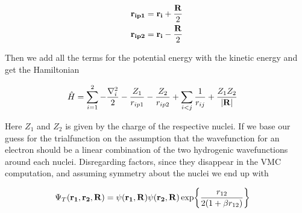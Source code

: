 		\begin{align}
			\vb{r_{ip1}} = \vb{r_i} + \frac{\vb{R}}{2}
			\\
			\vb{r_{ip2}} = \vb{r_i} - \frac{\vb{R}}{2}
		\end{align}

		Then we add all the terms for the potential energy with the kinetic energy and get the Hamiltonian

		\begin{align}
			\hat{H} &= \sum_{i = 1}^2 - \frac{\nabla^2_i}{2} - \frac{Z_1}{r_{ip1}} - \frac{Z_2}{r_{ip2}} + \sum_{i < j}\frac{1}{r_{ij}} + \frac{Z_1Z_2}{|\vb{R|}} \label{eq:hamiltonianMolecule}
		\end{align}

		Here \(Z_1\) and \(Z_2\) is given by the charge of the respective nuclei. If we base our guess for the trialfunction on the assumption that the wavefunction for an electron should be a linear combination of the two hydrogenic wavefunctions around each nuclei. Disregarding factors, since they disappear in the VMC computation, and assuming symmetry about the nuclei we end up with

		\begin{align}
			\Psi_T(\vb{r_1}, \vb{r_2} , \vb{R} ) &= \psi(\vb{r_1} , \vb{R})\psi(\vb{r_2} , \vb{R}) \exp{ \frac{r_{12}}{2(1+\beta r_{12})} } \label{eq:H2Trialfunction}
		\end{align}

